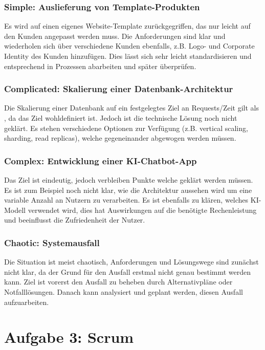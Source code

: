 \subsubsection*{Simple: Auslieferung von Template-Produkten}

Es wird auf einen eigenes Website-Template zurückgegriffen, das nur leicht auf den Kunden angepasst werden muss. Die Anforderungen sind klar und wiederholen sich über verschiedene Kunden ebenfalls, z.B. Logo- und Corporate Identity des Kunden hinzufügen. Dies lässt sich sehr leicht standardisieren und entsprechend in Prozessen abarbeiten und später überprüfen.

\subsubsection*{Complicated: Skalierung einer Datenbank-Architektur}

Die Skalierung einer Datenbank auf ein festgelegtes Ziel an Requests/Zeit gilt als , da das Ziel wohldefiniert ist. Jedoch ist die technische Lösung noch nicht geklärt. Es stehen verschiedene Optionen zur Verfügung (z.B. vertical scaling, sharding, read replicas), welche gegeneinander abgewogen werden müssen.

\subsubsection*{Complex: Entwicklung einer KI-Chatbot-App}

Das Ziel ist eindeutig, jedoch verbleiben Punkte welche geklärt werden müssen. Es ist zum Beispiel noch nicht klar, wie die Architektur aussehen wird um eine variable Anzahl an Nutzern zu verarbeiten. Es ist ebenfalls zu klären, welches KI-Modell verwendet wird, dies hat Auswirkungen auf die benötigte Rechenleistung und beeinflusst die Zufriedenheit der Nutzer.

\subsubsection*{Chaotic: Systemausfall}

Die Situation ist meist chaotisch, Anforderungen und Lösungswege sind zunächst nicht klar, da der Grund für den Ausfall erstmal nicht genau bestimmt werden kann. Ziel ist vorerst den Ausfall zu beheben durch Alternativpläne oder Notfalllösungen. Danach kann analysiert und geplant werden, diesen Ausfall aufzuarbeiten.

\section*{Aufgabe 3: Scrum}

